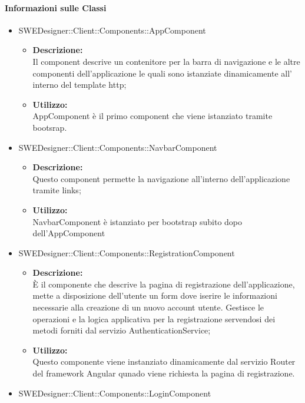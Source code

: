 		\paragraph{Informazioni sulle Classi}
		\begin{itemize}
			\item SWEDesigner::Client::Components::AppComponent
			\begin{itemize}
				\item \textbf{Descrizione: }\\
				Il component descrive un contenitore per la barra di navigazione e le altre
				componenti dell'applicazione le quali sono istanziate dinamicamente all'
				interno del template http;
				\item \textbf{Utilizzo: }\\
				AppComponent è il primo component che viene istanziato tramite bootsrap.
			\end{itemize}
			\item SWEDesigner::Client::Components::NavbarComponent
			\begin{itemize}
				\item \textbf{Descrizione: }\\
				Questo component permette la navigazione all'interno dell'applicazione
				tramite links;
				\item \textbf{Utilizzo: }\\
				NavbarComponent è istanziato per bootstrap subito dopo dell'AppComponent
			\end{itemize}
			\item SWEDesigner::Client::Components::RegistrationComponent
			\begin{itemize}
				\item \textbf{Descrizione: }\\
				È il componente che descrive la pagina di registrazione dell'applicazione,
				mette a disposizione dell'utente un form dove iserire le informazioni
				necessarie alla creazione di un nuovo account utente. Gestisce le
				operazioni e la logica applicativa per la registrazione servendosi dei
				metodi forniti dal servizio AuthenticationService;
				\item \textbf{Utilizzo: }\\
				Questo componente viene instanziato dinamicamente dal servizio Router del
				 framework Angular qunado viene richiesta la pagina di registrazione.
			\end{itemize}
			\item SWEDesigner::Client::Components::LoginComponent

\end{itemize}
